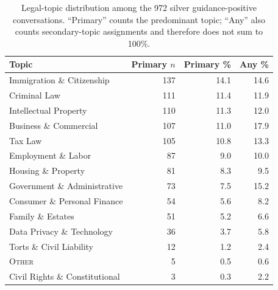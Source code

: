 \begin{table}[t]
\centering
\footnotesize
\setlength{\tabcolsep}{6pt}
\begin{tabular}{lrrr}
\toprule
Topic & Primary $n$ & Primary \% & Any \% \\
\midrule
Immigration \& Citizenship & 137 & 14.1 & 14.6 \\
Criminal Law & 111 & 11.4 & 11.9 \\
Intellectual Property & 110 & 11.3 & 12.0 \\
Business \& Commercial & 107 & 11.0 & 17.9 \\
Tax Law & 105 & 10.8 & 13.3 \\
Employment \& Labor & 87 & 9.0 & 10.0 \\
Housing \& Property & 81 & 8.3 & 9.5 \\
Government \& Administrative & 73 & 7.5 & 15.2 \\
Consumer \& Personal Finance & 54 & 5.6 & 8.2 \\
Family \& Estates & 51 & 5.2 & 6.6 \\
Data Privacy \& Technology & 36 & 3.7 & 5.8 \\
Torts \& Civil Liability & 12 & 1.2 & 2.4 \\
\textsc{Other} & 5 & 0.5 & 0.6 \\
Civil Rights \& Constitutional & 3 & 0.3 & 2.2 \\
\bottomrule
\end{tabular}
\caption{Legal-topic distribution among the 972 silver guidance-positive conversations. ``Primary'' counts the predominant topic; ``Any'' also counts secondary-topic assignments and therefore does not sum to 100\%.}
\label{tab:topic-distribution}
\end{table}